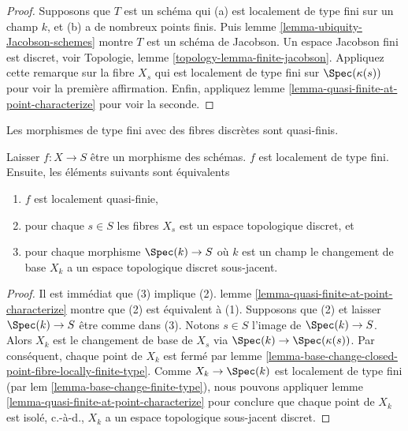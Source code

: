 \begin{proof}
Supposons que $T$ est un schéma qui (a) est localement de type fini sur un champ $k$, et (b) a de nombreux points finis. Puis lemme \ref{lemma-ubiquity-Jacobson-schemes} montre $T$ est un schéma de Jacobson. Un espace Jacobson fini est discret, voir Topologie, lemme \ref{topology-lemma-finite-jacobson}. Appliquez cette remarque sur la fibre $X_s$ qui est localement de type fini sur $\Spec(\kappa(s))$ pour voir la première affirmation. Enfin, appliquez lemme \ref{lemma-quasi-finite-at-point-characterize} pour voir la seconde.
\end{proof}

\begin{lemma}

\label{lemma-locally-quasi-finite-fibres}

\begin{slogan}

Les morphismes de type fini avec des fibres discrètes sont quasi-finis.

\end{slogan}

Laisser $f : X \to S$ être un morphisme des schémas. $f$ est localement de type fini. Ensuite, les éléments suivants sont équivalents

\begin{enumerate}

\item  $f$ est localement quasi-finie,
\item pour chaque $s \in S$ les fibres $X_s$ est un espace topologique discret, et
\item pour chaque morphisme $\Spec(k) \to S$ où $k$ est un champ le changement de base $X_k$ a un espace topologique discret sous-jacent.

\end{enumerate}

\end{lemma}

\begin{proof}
Il est immédiat que (3) implique (2). lemme \ref{lemma-quasi-finite-at-point-characterize} montre que (2) est équivalent à (1). Supposons que (2) et laisser $\Spec(k) \to S$ être comme dans (3). Notons $s \in S$ l'image de $\Spec(k) \to S$. Alors $X_k$ est le changement de base de $X_s$ via $\Spec(k) \to \Spec(\kappa(s))$. Par conséquent, chaque point de $X_k$ est fermé par lemme \ref{lemma-base-change-closed-point-fibre-locally-finite-type}. Comme $X_k \to \Spec(k)$ est localement de type fini (par lem \ref{lemma-base-change-finite-type}), nous pouvons appliquer lemme \ref{lemma-quasi-finite-at-point-characterize} pour conclure que chaque point de $X_k$ est isolé, c.-à-d., $X_k$ a un espace topologique sous-jacent discret.
\end{proof}

